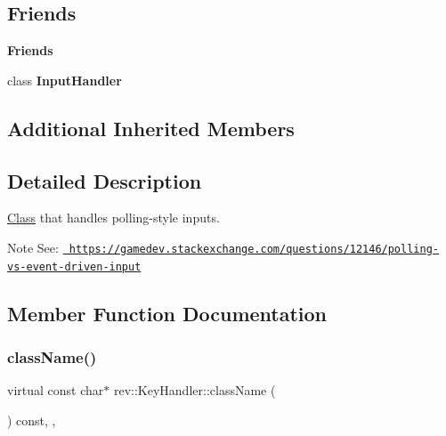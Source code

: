 \subsection*{Friends}
\begin{Indent}\textbf{ Friends}\par
\begin{DoxyCompactItemize}
\item 
\mbox{\label{classrev_1_1_key_handler_a28c677eee06763681231ba62273b9fad}} 
class {\bfseries Input\+Handler}
\end{DoxyCompactItemize}
\end{Indent}
\subsection*{Additional Inherited Members}


\subsection{Detailed Description}
\mbox{\hyperlink{struct_class}{Class}} that handles polling-\/style inputs. 

\begin{DoxyNote}{Note}
See\+: \href{https://gamedev.stackexchange.com/questions/12146/polling-vs-event-driven-input}{\texttt{ https\+://gamedev.\+stackexchange.\+com/questions/12146/polling-\/vs-\/event-\/driven-\/input}} 
\end{DoxyNote}


\subsection{Member Function Documentation}
\mbox{\label{classrev_1_1_key_handler_ae65760c99f0973da1d1290b35dfed051}} 
\subsubsection{\texorpdfstring{className()}{className()}}
{\footnotesize\ttfamily virtual const char$\ast$ rev\+::\+Key\+Handler\+::class\+Name (\begin{DoxyParamCaption}{ }\end{DoxyParamCaption}) const\hspace{0.3cm}{\ttfamily [inline]}, {\ttfamily [override]}, {\ttfamily [virtual]}}



